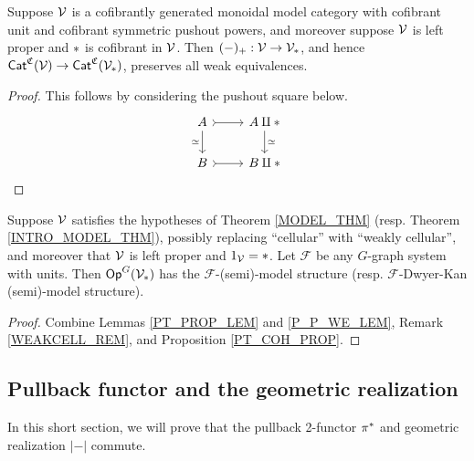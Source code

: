 \documentclass[a4paper,10pt
,draft
]{article}%
\renewcommand{\F}{\mathcal F}
\renewcommand{\1}{\eta}%
\begin{document}
\begin{lemma}
      \label{P_P_WE_LEM}
      Suppose $\mathcal V$ is a cofibrantly generated monoidal model category with cofibrant unit and cofibrant symmetric pushout powers,
      and moreover suppose $\mathcal V$ is left proper and $\**$ is cofibrant in $\mathcal V$.
      Then $(-)_+: \V \to \V_{\**}$, and hence $\Cat^{\mathfrak C}(\V) \to \Cat^{\mathfrak C}(\V_{\**})$, preserves all weak equivalences.
\end{lemma}
\begin{proof}
      This follows by considering the pushout square below.
      \begin{equation}
            \begin{tikzcd}
                  A \arrow[r, rightarrowtail] \arrow[d, "\simeq"']
                  &
                  A \amalg \** \arrow[d, "\simeq"]
                  \\
                  B \arrow[r, rightarrowtail]
                  &
                  B \amalg \**
            \end{tikzcd}
      \end{equation}
\end{proof}

\begin{corollary}
      \label{PT_MODEL_COR}
      Suppose $\mathcal V$ satisfies the hypotheses of Theorem \ref{MODEL_THM} (resp. Theorem \ref{INTRO_MODEL_THM}),
      possibly replacing ``cellular'' with ``weakly cellular'',
      and moreover that $\mathcal V$ is left proper and $1_\V = \**$.
      Let $\F$ be any $G$-graph system with units.
      Then $\Op^G(\V_{\**})$ has the $\F$-(semi)-model structure (resp. $\F$-Dwyer-Kan (semi)-model structure).
\end{corollary}
\begin{proof}
      Combine Lemmas \ref{PT_PROP_LEM} and \ref{P_P_WE_LEM}, Remark \ref{WEAKCELL_REM}, and Proposition \ref{PT_COH_PROP}.
\end{proof}





\subsection{Pullback functor and the geometric realization}

In this short section, we will prove that the pullback 2-functor $\pi^{\**}$ and geometric realization $|-|$ commute.
\end{document}
